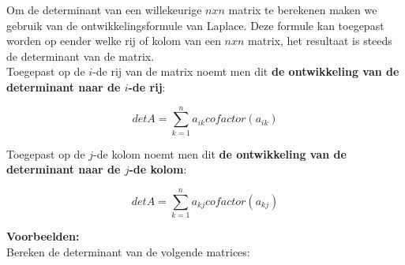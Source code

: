 Om de determinant van een willekeurige $nxn$ matrix te berekenen maken we gebruik van de ontwikkelingsformule van Laplace. Deze formule kan toegepast worden op eender welke rij of kolom van een $nxn$ matrix, het resultaat is steeds de determinant van de matrix.\\

Toegepast op de $i$-de rij van de matrix noemt men dit {\bf de ontwikkeling van de determinant naar de $i$-de rij}:

\begin{framed}

\[ det A=\sum\limits_{k=1}^{n} a_{ik}cofactor(a_{ik}) \] 

\end{framed}

Toegepast op de $j$-de kolom noemt men dit {\bf de ontwikkeling van de determinant naar de $j$-de kolom}:

\begin{framed}
	
\[ det A=\sum\limits_{k=1}^{n} a_{kj}cofactor(a_{kj}) \]

\end{framed}

{\bf Voorbeelden:}\\

Bereken de determinant van de volgende matrices:

